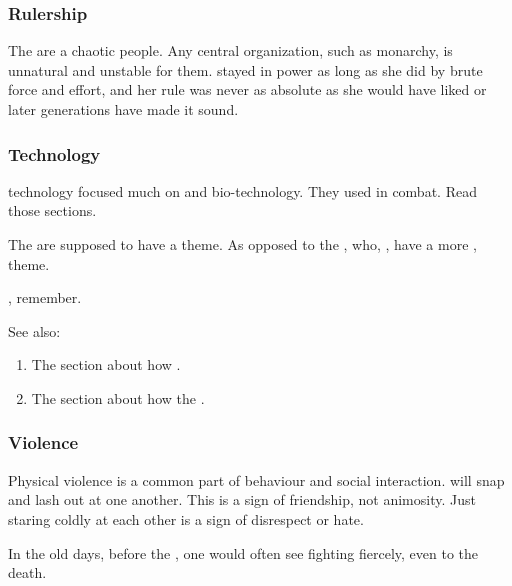 \subsubsection{Rulership}
The \dragons{} are a chaotic people. 
Any central organization, such as monarchy, is unnatural and unstable for them. 
 stayed in power as long as she did by brute force and effort, and her rule was never as absolute as she would have liked or later generations have made it sound. 





\subsubsection{Technology}
\Draconic technology focused much on  and bio-technology. 
They used  in combat. 
Read those sections. 

The \dragons are supposed to have a  theme.
As opposed to the \resphain, who, , have a more ,  theme. 

, remember. 

See also: 
\begin{enumerate}
  \item 
    The section about how .
  \item 
    The section about how the \dragons {}. 
\end{enumerate}






\subsubsection{Violence}
Physical violence is a common part of \Draconic{} behaviour and social interaction. 
\Dragons{} will snap and lash out at one another. 
This is a sign of friendship, not animosity. 
Just staring coldly at each other is a sign of disrespect or hate. 

In the old days, before the \secondbanewar, one would often see \dragons{} fighting fiercely, even to the death. 

